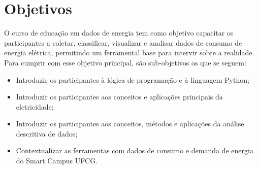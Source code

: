 \section{Objetivos}
O curso de educação em dados de energia tem como objetivo capacitar os participantes a coletar, classificar, visualizar e analisar dados de consumo de energia elétrica, permitindo um ferramental base para intervir sobre a realidade. Para cumprir com esse objetivo principal, são sub-objetivos os que se seguem:

\begin{itemize}
	\item Introduzir os participantes à lógica de programação e à linguagem Python;
	\item Introduzir os participantes aos conceitos e aplicações principais da eletricidade;
	\item Introduzir os participantes aos conceitos, métodos e aplicações da análise descritiva de dados;
	\item Contextualizar as ferramentas com dados de consumo e demanda de energia do Smart Campus UFCG.
\end{itemize}
